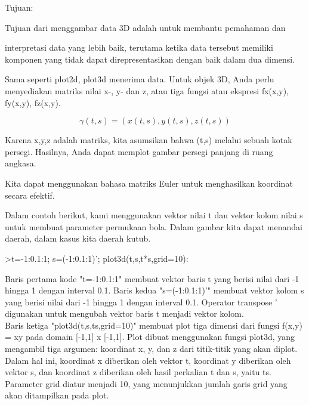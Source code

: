 \documentclass[a4paper,10pt]{article}
\begin{document}
\begin{eulernotebook}
\begin{eulercomment}
\begin{eulercomment}
\begin{eulercomment}
\begin{eulercomment}
\begin{eulercomment}
\begin{eulercomment}
\begin{eulercomment}
\begin{eulercomment}
\begin{eulercomment}
Tujuan:

\end{eulercomment}
\begin{eulerttcomment}
  Tujuan dari menggambar data 3D adalah untuk membantu pemahaman dan
\end{eulerttcomment}
\begin{eulercomment}
interpretasi data yang lebih baik, terutama ketika data tersebut
memiliki komponen yang tidak dapat direpresentasikan dengan baik dalam
dua dimensi.

Sama seperti plot2d, plot3d menerima data. Untuk objek 3D, Anda perlu
menyediakan matriks nilai x-, y- dan z, atau tiga fungsi atau ekspresi
fx(x,y), fy(x,y), fz(x,y).

\end{eulercomment}
\begin{eulerformula}
\[
\gamma(t,s) = (x(t,s),y(t,s),z(t,s))
\]
\end{eulerformula}
\begin{eulercomment}
Karena x,y,z adalah matriks, kita asumsikan bahwa (t,s) melalui sebuah
kotak persegi. Hasilnya, Anda dapat memplot gambar persegi panjang di
ruang angkasa.

Kita dapat menggunakan bahasa matriks Euler untuk menghasilkan
koordinat secara efektif.

Dalam contoh berikut, kami menggunakan vektor nilai t dan vektor kolom
nilai s untuk membuat parameter permukaan bola. Dalam gambar kita
dapat menandai daerah, dalam kasus kita daerah kutub.

\end{eulercomment}
\begin{eulerprompt}
>t=-1:0.1:1; s=(-1:0.1:1)'; plot3d(t,s,t*s,grid=10):
\end{eulerprompt}
\begin{eulercomment}
Baris pertama kode "t=-1:0.1:1" membuat vektor baris t yang berisi
nilai dari -1 hingga 1 dengan interval 0.1. Baris kedua
"s=(-1:0.1:1)'" membuat vektor kolom s yang berisi nilai dari -1
hingga 1 dengan interval 0.1. Operator transpose ' digunakan untuk
mengubah vektor baris t menjadi vektor kolom.\\
Baris ketiga "plot3d(t,s,ts,grid=10)" membuat plot tiga dimensi dari
fungsi f(x,y) = xy pada domain [-1,1] x [-1,1]. Plot dibuat
menggunakan fungsi plot3d, yang mengambil tiga argumen: koordinat x,
y, dan z dari titik-titik yang akan diplot. Dalam hal ini, koordinat x
diberikan oleh vektor t, koordinat y diberikan oleh vektor s, dan
koordinat z diberikan oleh hasil perkalian t dan s, yaitu ts.
Parameter grid diatur menjadi 10, yang menunjukkan jumlah garis grid
yang akan ditampilkan pada plot.


\end{eulercomment}
\end{eulercomment}
\end{eulercomment}
\end{eulercomment}
\end{eulercomment}
\end{eulercomment}
\end{eulercomment}
\end{eulercomment}
\end{eulercomment}
\end{eulernotebook}
\end{document}
